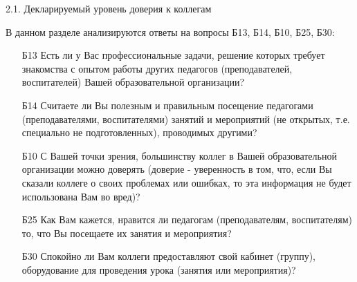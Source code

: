 \begin{frame}{2.1. Декларируемый уровень доверия к коллегам }

\tiny

В данном разделе анализируются ответы на вопросы Б13, Б14, Б10, Б25, Б30:
\bigskip

\begin{itemize}

\item [Б13] Есть ли у Вас профессиональные задачи, решение которых требует знакомства с опытом работы других педагогов (преподавателей, воспитателей) Вашей образовательной организации?

\item [Б14] Считаете ли Вы полезным и правильным посещение педагогами (преподавателями, воспитателями)  занятий и мероприятий (не открытых, т.е. специально не подготовленных), проводимых другими?

\item [Б10] С Вашей точки зрения, большинству коллег в Вашей образовательной организации можно доверять (доверие - уверенность в том, что, если Вы сказали коллеге о своих проблемах или ошибках, то эта информация не будет использована Вам во вред)?

\item[Б25] Как Вам кажется, нравится ли педагогам (преподавателям, воспитателям) то, что Вы посещаете их занятия и мероприятия?

\item[Б30] Спокойно ли Вам коллеги предоставляют свой кабинет (группу), оборудование для проведения урока (занятия или мероприятия)?

\end{itemize}

\end{frame}


